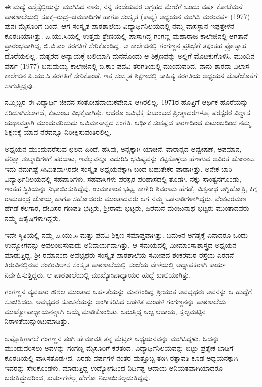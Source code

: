ಈ ಮಧ್ಯೆ ಎಸ್ಸೆಸ್ಸೆಲ್ಸಿಯನ್ನು ಮುಗಿಸಿದ ನಾನು, ನನ್ನ ತಂದೆಯವರ ಆಗ್ರಹದ ಮೇರೆಗೆ ಒಂದು ವರ್ಷ ಕೋಟೆಮನೆ ಪಾಠಶಾಲೆಯಲ್ಲಿ ಸೂಕ್ತ–ರುದ್ರ–ಚಮಕಾದಿಗಳ ಹಾಗೂ ಸಂಸ್ಕೃತ (ಕಾವ್ಯ) ಅಧ್ಯಯನ ಮುಗಿಸಿ ಮರುವರ್ಷ (1977) ಪುನಃ ಮೈಸೂರಿಗೆ ಬಂದೆ. ಆಗ ಸಂಸ್ಕೃತ ಪಾಠಶಾಲೆಯ ವಿದ್ಯಾರ್ಥಿನಿಲಯದಲ್ಲಿ ನಮ್ಮ ವಾಸಸ್ಥಾನ ಇಪ್ಪತ್ತೇಳನೆ ಕೊಠಡಿಯಾಗಿತ್ತು. ಪಿ.ಯು.ಸಿಯಲ್ಲಿ ಉತ್ತಮ ಶ್ರೇಣಿಯಲ್ಲಿ ಪಾಸಾಗಿದ್ದ ಗಂಗಣ್ಣ ಮಹಾರಾಜ ಕಾಲೇಜಿನಲ್ಲಿ ಆಗತಾನೆ ಪ್ರಾರಂಭವಾಗಿದ್ದ, ಬಿ.ಬಿ.ಎಂ ತರಗತಿಗೆ ಸೇರಿಕೊಂಡಿದ್ದ. ಆ ಕಾಲೇಜಿನಲ್ಲಿ ಗಂಗಣ್ಣನ ಪ್ರತಿಭೆಗೆ ತಕ್ಕಂತಹ ಪ್ರೋತ್ಸಾಹ ದೊರೆಯಲಿಲ್ಲ. ಮತ್ಸರದ ಅನ್ಯಾಯಕ್ಕೆ ಬಲಿಯಾಗಿ ಮನನೊಂದು ಆ ಶಿಕ್ಷಣವನ್ನು ಅಲ್ಲಿಗೆ ಮೊಟಕುಗೊಳಿಸಿ, ಮುಂದಿನ ವರ್ಷ (1977) ಬನುಮಯ್ಯ ಕಾಲೇಜಿನಲ್ಲಿ ಬಿ.ಕಾಂ ಪದವಿ ತರಗತಿಯಲ್ಲಿ ಮುಂದುವರಿದ. ನಾನು ಶಾರದಾ ವಿಲಾಸ ಕಾಲೇಜಿನ ಪಿ.ಯು.ಸಿ ತರಗತಿಗೆ ಸೇರಿಕೊಂಡೆ. ಇತ್ತ ಸಂಸ್ಕೃತ ಶಿಕ್ಷಣದಲ್ಲಿ ಸಾಹಿತ್ಯ ತರಗತಿಯ ಅಧ್ಯಯನ ಜೊತೆಜೊತೆಗೆ ಸಾಗುತ್ತಿದ್ದವು. 

ನಮ್ಮಿಬ್ಬರ ಈ ವಿದ್ಯಾರ್ಥಿ ಜೀವನ ಸಂತೋಷದಾಯಕವೇನೂ ಆಗಿರಲಿಲ್ಲ. 1971ರ ಹೊತ್ತಿಗೆ ಆರ್ಥಿಕ ಹೊರೆಯನ್ನು ಸರಿದೂಗಿಸಲಾಗದೆ, ಕುಟುಂಬ	ವಿಭಕ್ತವಾಗಿತ್ತು. ಆದರೂ ಅವಿಭಕ್ತ ಕುಟುಂಬದ ಪ್ರೀತ್ಯಾದರಗಳೂ, ಪರಸ್ಪರರ ವಿಶ್ವಾಸ ಯಥಾವತ್ತಾಗಿ ಮುಂದುವರಿದುದು ಅಭಿಮಾನಾಸ್ಪದ ಸಂಗತಿ. ಆರ್ಥಿಕ ಸಂಕಷ್ಟದ ಕಾರಣದಿಂದ ಕುಟುಂಬದಿಂದ ನಮ್ಮ ಶಿಕ್ಷಣಕ್ಕೆ ಯಾವ ನೆರವನ್ನೂ ನಿರೀಕ್ಷಿಸುವಂತಿರಲಿಲ್ಲ.

ಅಧ್ಯಯನ ಮುಂದುವರೆಸುವ ಛಲದ ಹಿಂದೆ, ಹಸಿವು, ಅನ್ನಕ್ಕಾಗಿ ಯಾಚನೆ, ವಾರಾನ್ನದ ಅನ್ವೇಷಣೆ, ಅಪಮಾನ, ಪರಿಕ್ಷಾ ಶುಲ್ಕಾದಿಗಳಿಗೆ ಪರದಾಟ, ಇವೆಲ್ಲವನ್ನೂ ಎದುರಿಸಿ ಭವಿಷ್ಯವನ್ನು ಕಟ್ಟಿಕೊಳ್ಳಲು ಹೆಣಗುವ ಅವಿರತ ಹೋರಾಟ. ಇದು ನಮಗಷ್ಟೆ ಸೀಮಿತವಾಗಿರದೇ ಸಂಸ್ಕೃತ ಅಧ್ಯಯನಕ್ಕಾಗಿ ಬಂದ ಬಹುತೇಕರ ಪಾಡಾಗಿತ್ತು. ಅನೇಕ ಬಾರಿ ವಿದ್ಯಾರ್ಥಿನಿಲಯದಲ್ಲಿ ಸಹಪಾಠಿಗಳು, ಸಹವಾಸಿಗಳು ಪರಸ್ಪರ ಪರಿಹಾಸದಲ್ಲಿ ತೊಡಗಿ, ನಕ್ಕು ಸಾಂತ್ವನಗೊಂಡು, ಇಂತಹ ಸ್ಥಿತಿಯನ್ನು ನಿಭಾಯಿಸುತ್ತಿದ್ದೆವು. ಉಮಾಕಾಂತ ಭಟ್ಟ, ಕಾಗೇರಿ ಶಿವರಾಮ ಹೆಗಡೆ, ವಿಶ್ವನಾಥ ಅಗ್ನಿಹೋತ್ರಿ, ಕಿಗ್ಗ ರಾಮಚಂದ್ರ ಜೋಯ್ಸ ಹಾಗೂ ಸಹೋದರರು ಮುಂತಾದವರು ಆಗ ನಮ್ಮ ಒಡನಾಡಿಗಳಾಗಿದ್ದರು. ವೆಂಕಟರಮಣ ಹೆಗಡೆ ಕಲಗಾರ, ದೇವಿಸರ ಗಣಪತಿ ಭಟ್ಟರು, ಶ್ರೀರಾಮ ಭಟ್ಟರು, ಹಿರೆಮನೆ ಮಂಜುನಾಥ ಭಟ್ಟರು ಮುಂತಾದವರು ನಮ್ಮ ಹಿತೈಷಿಗಳಾಗಿದ್ದರು.

ಇದೇ ಸ್ಥಿತಿಯಲ್ಲಿ ನಮ್ಮ ಪಿ.ಯು.ಸಿ ಮತ್ತು ಪದವಿ ಶಿಕ್ಷಣ ಸಮಾಪ್ತವಾಗಿತ್ತು. ಬದುಕಿನ ಅಗತ್ಯಕ್ಕೆ ಏನಾದರೂ ಒಂದು  ಉದ್ಯೋಗವನ್ನು ಅವಲಂಬಿಸುವುದು ಅನಿವಾರ್ಯವಾಗಿತ್ತು. ಆ ಸಮಯದಲ್ಲಿ ಮೀಮಾಂಸಾಶಾಸ್ತ್ರದ ಅಧ್ಯಯನ ಮಾಡುತ್ತಿದ್ದ, ಶ್ರೀ ರಮಾನಂದ ಅವಭೃಥರು ಸಂಸ್ಕೃತ ಪಾಠಶಾಲೆಯ ಸಮೀಪದ ಶಂಕರಮಠ ರಸ್ತೆಯ ಎರಡನೆ ತಿರುವಿನಲ್ಲಿರುವ ಶಂಕರವಿಲಾಸ ಸಂಸ್ಕೃತ ಪಾಠಶಾಲೆಯಲ್ಲಿ ಸಂಜೆಯ ವೇಳೆಯಲ್ಲಿ ಅಧ್ಯಾಪಕರಾಗಿ ಕಾರ್ಯ ನಿರ್ವಹಿಸುತ್ತಿದ್ದರು. ಆ ಪಾಠಶಾಲೆಯಲ್ಲಿ ಮುಖ್ಯೋಪಾಧ್ಯಾಯರ ಹುದ್ದೆ ಖಾಲಿಯಾಗಿತ್ತು. 

ಗಂಗಣ್ಣನ ವ್ಯವಹಾರ ಕೌಶಲ ಮುಂತಾದ ಅರ್ಹತೆಯನ್ನು ಮನಗಂಡಿದ್ದ ಶ್ರೀಯುತ ಅವಭೃಥರು ಅವನನ್ನು ಆ ಹುದ್ದೆಗೆ ಸೂಚಿಸಿದರು. ಅವಭೃಥರ ಸೂಚನೆಯನ್ನು ಅಂಗೀಕರಿಸಿದ ಆಡಳಿತ ಮಂಡಳಿ ಗಂಗಣ್ಣನನ್ನು ಪಾಠಶಾಲೆಯ ಮುಖ್ಯೋಪಾಧ್ಯಾಯನನ್ನಾಗಿ ಆಯ್ಕೆ ಮಾಡಿಕೊಂಡಿತು. ಬರುತ್ತಿದ್ದ ಅಲ್ಪ ಆದಾಯ, ಸ್ವಲ್ಪಮಟ್ಟಿನ ನಿರಾಳತೆಯನ್ನುಂಟುಮಾಡಿತ್ತು.

ಅಷ್ಟೊತ್ತಿಗಾಗಲೆ ಗಂಗಣ್ಣನ ತಂಗಿ ಹೇಮಾವತಿ ತನ್ನ ಮೆಟ್ರಿಕ್ ಅಧ್ಯಯನವನ್ನು ಮುಗಿಸಿದ್ದಳು. ಓದನ್ನು ಮುಂದುವರಿಸಲು  ಅವಳನ್ನು ಗಂಗಣ್ಣ ಮೈಸೂರಿಗೆ ಕರೆತಂದ. ವಿದ್ಯಾರ್ಥಿನಿಲಯವನ್ನು ಬಿಟ್ಟು ಪ್ರತ್ಯೇಕ ಬಾಡಿಗೆ ಕೊಠಡಿಯಲ್ಲಿ ವಾಸಿಸತೊಡಗಿದ. ಎರಡು ವರ್ಷಗಳ ನಂತರ ಮತ್ತೊಬ್ಬ ತಂಗಿ ರತ್ನಾವತಿ ಕೂಡ ಅಧ್ಯಯನಕ್ಕಾಗಿ ಇವರನ್ನು ಸೇರಿಕೊಂಡಳು. ಮಾಡುತ್ತಿದ್ದ ಉದ್ಯೋಗದಿಂದ ನಿರ್ದಿಷ್ಟ ಆದಾಯ ಅನಿಯತವಾಗಿಯಾದರೂ ಬರುತ್ತಿದ್ದುದರಿಂದ, ಖರ್ಚುಗಳೆಲ್ಲ ಹೇಗೋ ನಿಭಾಯಿಸಲ್ಪಡುತ್ತಿದ್ದವು.

